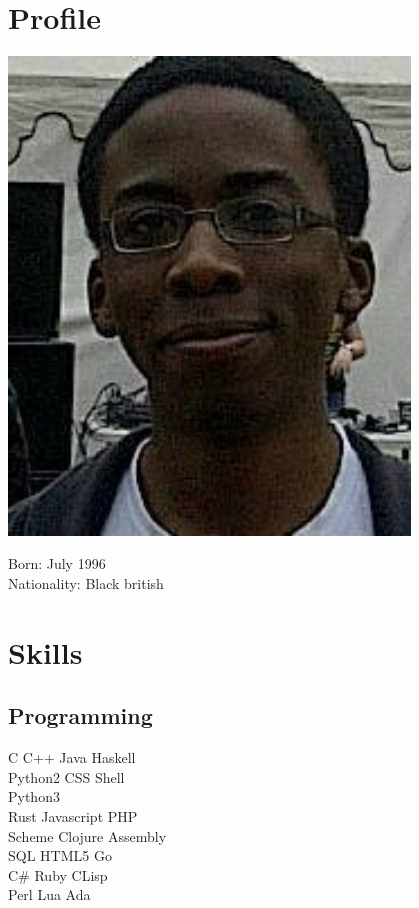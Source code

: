 \documentclass[11pt, a4paper]{cv}
\begin{document}
\begin{minipage}[t]{0.33\textwidth} %

\section{Profile}

\includegraphics[width=0.8\textwidth]{profile.png}

Born: July 1996 \\
Nationality: Black british

\section{Skills}

\subsection{Programming}

C \textbullet{} C++ \textbullet{} Java \textbullet{} Haskell \\
Python2 \textbullet{} CSS \textbullet{} Shell \\
Python3 \textbullet{} \LaTeXe\  \\\vspace{4pt}
Rust \textbullet{} Javascript \textbullet{} PHP \\
Scheme \textbullet{} Clojure \textbullet{} Assembly \\
SQL \textbullet{} {\small HTML5} \textbullet{} Go \\\vspace{4pt}
C\# \textbullet{} Ruby \textbullet{} CLisp \\
Perl \textbullet{} Lua \textbullet{} Ada


\end{minipage}
\end{document}
